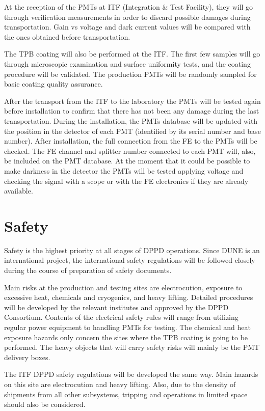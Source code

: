 At the reception of the PMTs at ITF (Integration \& Test Facility), they will go through verification measurements in order to discard possible damages during transportation. Gain vs voltage and dark current values will be compared with the ones obtained before transportation.

The TPB coating will also be performed at the ITF. The first few samples will go through microscopic examination and surface uniformity tests, and the coating procedure will be validated. The production PMTs will be randomly sampled for basic coating quality assurance.

After the transport from the ITF to the laboratory the PMTs will be tested again before installation to confirm that there has not been any damage during the last transportation. During the installation, the PMTs database will be updated with the position in the detector of each PMT (identified by its serial number and base number). After installation, the full connection from the FE to the PMTs will be checked. The FE channel and splitter number connected to each PMT will, also, be included on the PMT database. At the moment that it could be possible to make darkness in the detector the PMTs will be tested applying voltage and checking the signal with a scope or with the FE electronics if they are already available.

\section{Safety}
\label{sec:fddp-pd-11}

Safety is the highest priority at all stages of DPPD operations. Since DUNE is an international project, the international safety regulations will be followed closely during the course of preparation of safety documents.

Main risks at the production and testing sites are electrocution, exposure to excessive heat, chemicals and cryogenics, and heavy lifting. Detailed procedures will be developed by the relevant institutes and approved by the DPPD Consortium. Contents of the electrical safety rules will range from utilizing regular power equipment to handling PMTs for testing. The chemical and heat exposure hazards only concern the sites where the TPB coating is going to be performed. The heavy objects that will carry safety risks will mainly be the PMT delivery boxes.

The ITF DPPD safety regulations will be developed the same way. Main hazards on this site are electrocution and heavy lifting. Also, due to the density of shipments from all other subsystems, tripping and operations in limited space should also be considered.

